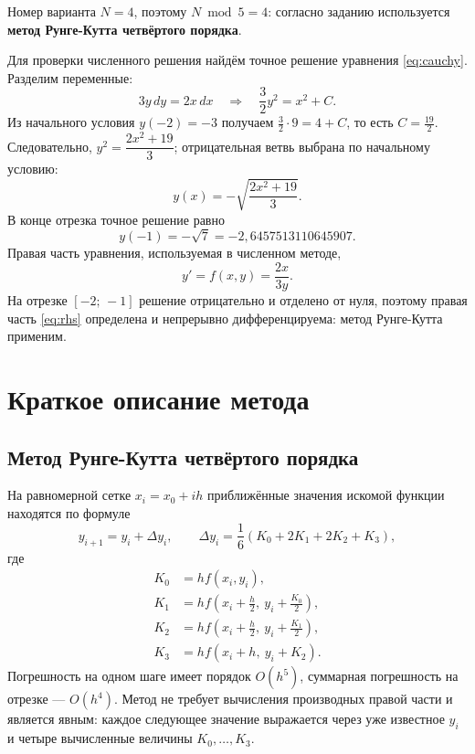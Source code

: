 \documentclass[14pt,a4paper]{extarticle}
\begin{document}
Номер варианта $N=4$, поэтому $N \bmod 5 = 4$: согласно заданию
используется \textbf{метод Рунге-Кутта четвёртого порядка}.

Для проверки численного решения найдём точное решение уравнения
\eqref{eq:cauchy}. Разделим переменные:
\[
    3y\,dy = 2x\,dx \quad\Longrightarrow\quad
    \frac{3}{2}y^2 = x^2 + C .
\]
Из начального условия $y(-2)=-3$ получаем
$\frac{3}{2}\cdot 9 = 4 + C$, то есть $C = \frac{19}{2}$. Следовательно,
$y^2 = \dfrac{2x^2+19}{3}$; отрицательная ветвь выбрана по начальному
условию:
\begin{equation}
    y(x) = -\sqrt{\frac{2x^2+19}{3}} .
    \label{eq:exact}
\end{equation}
В конце отрезка точное решение равно
\begin{equation}
    y(-1) = -\sqrt{7} = -2{,}6457513110645907 .
    \label{eq:exact-end}
\end{equation}
Правая часть уравнения, используемая в численном методе,
\begin{equation}
    y' = f(x,y) = \frac{2x}{3y} .
    \label{eq:rhs}
\end{equation}
На отрезке $[-2;\,-1]$ решение отрицательно и отделено от нуля, поэтому
правая часть \eqref{eq:rhs} определена и непрерывно дифференцируема:
метод Рунге-Кутта применим.

\section{Краткое описание метода}

\subsection{Метод Рунге-Кутта четвёртого порядка}

На равномерной сетке $x_i = x_0 + ih$ приближённые значения искомой
функции находятся по формуле
\begin{equation}
    y_{i+1} = y_i + \Delta y_i, \qquad
    \Delta y_i = \frac{1}{6}\left(K_0 + 2K_1 + 2K_2 + K_3\right),
    \label{eq:rk4}
\end{equation}
где
\begin{equation}
    \begin{aligned}
        K_0 &= h f(x_i, y_i),\\
        K_1 &= h f\!\left(x_i + \frac{h}{2},\ y_i + \frac{K_0}{2}\right),\\
        K_2 &= h f\!\left(x_i + \frac{h}{2},\ y_i + \frac{K_1}{2}\right),\\
        K_3 &= h f\!\left(x_i + h,\ y_i + K_2\right).
    \end{aligned}
    \label{eq:rk4-k}
\end{equation}
Погрешность на одном шаге имеет порядок $O(h^5)$, суммарная погрешность
на отрезке --- $O(h^4)$. Метод не требует вычисления производных правой
части и является явным: каждое следующее значение выражается через
уже известное $y_i$ и четыре вычисленные величины $K_0,\ldots,K_3$.
\end{document}
